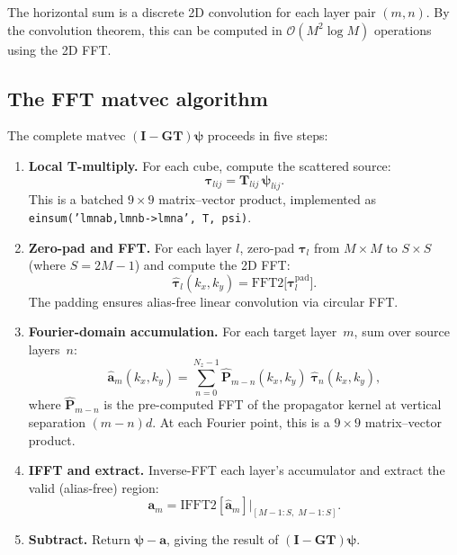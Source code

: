 \documentclass[11pt,a4paper]{article}
\newcommand{\order}{\mathcal{O}}
\newcommand{\bG}{\bm{G}}
\newcommand{\bT}{\bm{T}}
\newcommand{\bI}{\bm{I}}
\newcommand{\bP}{\bm{P}}
\begin{document}
The horizontal sum is a discrete 2D convolution for each layer
pair $(m, n)$.  By the convolution theorem, this can be computed
in $\order(M^2 \log M)$ operations using the 2D FFT.

\subsection{The FFT matvec algorithm}

The complete matvec $(\bI - \bG\bT)\bm{\psi}$ proceeds in five steps:

\begin{enumerate}
  \item \textbf{Local T-multiply.}  For each cube, compute the
    scattered source:
    \begin{equation}
      \bm{\tau}_{lij} = \bT_{lij}\,\bm{\psi}_{lij}.
    \end{equation}
    This is a batched $9 \times 9$ matrix--vector product, implemented
    as \texttt{einsum('lmnab,lmnb->lmna', T, psi)}.

  \item \textbf{Zero-pad and FFT.}  For each layer $l$, zero-pad
    $\bm{\tau}_l$ from $M \times M$ to $S \times S$ (where
    $S = 2M - 1$) and compute the 2D FFT:
    \begin{equation}
      \hat{\bm{\tau}}_l(k_x, k_y) = \text{FFT2}\bigl[\bm{\tau}_l^{\text{pad}}\bigr].
    \end{equation}
    The padding ensures alias-free linear convolution via circular
    FFT.

  \item \textbf{Fourier-domain accumulation.}  For each target
    layer~$m$, sum over source layers~$n$:
    \begin{equation}\label{eq:fourier_acc}
      \hat{\bm{a}}_m(k_x, k_y)
      = \sum_{n=0}^{N_z-1}
        \hat{\bP}_{m-n}(k_x, k_y)\;\hat{\bm{\tau}}_n(k_x, k_y),
    \end{equation}
    where $\hat{\bP}_{m-n}$ is the pre-computed FFT of the
    propagator kernel at vertical separation $(m-n)d$.  At each
    Fourier point, this is a $9 \times 9$ matrix--vector product.

  \item \textbf{IFFT and extract.}  Inverse-FFT each layer's
    accumulator and extract the valid (alias-free) region:
    \begin{equation}
      \bm{a}_m = \text{IFFT2}[\hat{\bm{a}}_m]
        \big|_{[M{-}1 : S,\; M{-}1 : S]}.
    \end{equation}

  \item \textbf{Subtract.}  Return $\bm{\psi} - \bm{a}$, giving
    the result of $(\bI - \bG\bT)\bm{\psi}$.
\end{enumerate}
\end{document}

